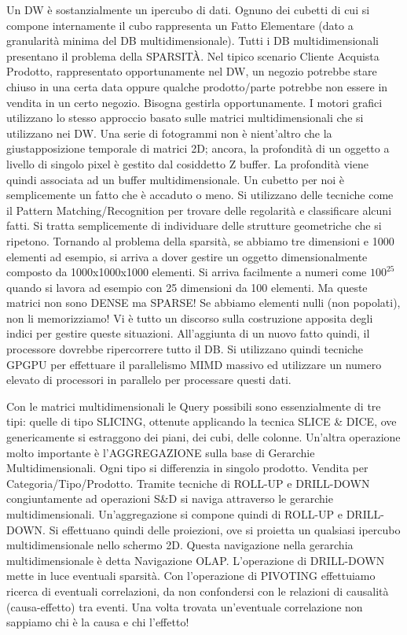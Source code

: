 Un DW è sostanzialmente un ipercubo di dati. Ognuno dei cubetti di cui si compone internamente il cubo rappresenta un Fatto Elementare (dato a granularità minima del DB multidimensionale). Tutti i DB multidimensionali presentano il problema della SPARSIT\`A. Nel tipico scenario Cliente Acquista Prodotto, rappresentato opportunamente nel DW, un negozio potrebbe stare chiuso in una certa data oppure qualche prodotto/parte potrebbe non essere in vendita in un certo negozio. Bisogna gestirla opportunamente. I motori grafici utilizzano lo stesso approccio basato sulle matrici multidimensionali che si utilizzano nei DW. Una serie di fotogrammi non è nient'altro che la giustapposizione temporale di matrici 2D; ancora, la profondità di un oggetto a livello di singolo pixel è gestito dal cosiddetto Z buffer. La profondità viene quindi associata ad un buffer multidimensionale. Un cubetto per noi è semplicemente un fatto che è accaduto o meno. Si utilizzano delle tecniche come il Pattern Matching/Recognition per trovare delle regolarità e classificare alcuni fatti. Si tratta semplicemente di individuare delle strutture geometriche che si ripetono. Tornando al problema della sparsità, se abbiamo tre dimensioni e 1000 elementi ad esempio, si arriva a dover gestire un oggetto dimensionalmente composto da 1000x1000x1000 elementi. Si arriva facilmente a numeri come $100^{25}$ quando si lavora ad esempio con 25 dimensioni da 100 elementi. Ma queste matrici non sono DENSE ma SPARSE! Se abbiamo elementi nulli (non popolati), non li memorizziamo! Vi è tutto un discorso sulla costruzione apposita degli indici per gestire queste situazioni. All'aggiunta di un nuovo fatto quindi, il processore dovrebbe ripercorrere tutto il DB. Si utilizzano quindi tecniche GPGPU per effettuare il parallelismo MIMD massivo ed utilizzare un numero elevato di processori in parallelo per processare questi dati. 

Con le matrici multidimensionali le Query possibili sono essenzialmente di tre tipi: quelle di tipo SLICING, ottenute applicando la tecnica SLICE \& DICE, ove genericamente si estraggono dei piani, dei cubi, delle colonne. Un'altra operazione molto importante è l'AGGREGAZIONE sulla base di Gerarchie Multidimensionali. Ogni tipo si differenzia in singolo prodotto. Vendita per Categoria/Tipo/Prodotto. Tramite tecniche di ROLL-UP e DRILL-DOWN congiuntamente ad operazioni S\&D si naviga attraverso le gerarchie multidimensionali. Un’aggregazione si compone quindi di ROLL-UP e DRILL-DOWN. Si effettuano quindi delle proiezioni, ove si proietta un qualsiasi ipercubo multidimensionale nello schermo 2D. Questa navigazione nella gerarchia multidimensionale è detta Navigazione OLAP. L'operazione di DRILL-DOWN mette in luce eventuali sparsità. Con l'operazione di PIVOTING effettuiamo ricerca di eventuali correlazioni, da non confondersi con le relazioni di causalità (causa-effetto) tra eventi. Una volta trovata un'eventuale correlazione non sappiamo chi è la causa e chi l'effetto!  

